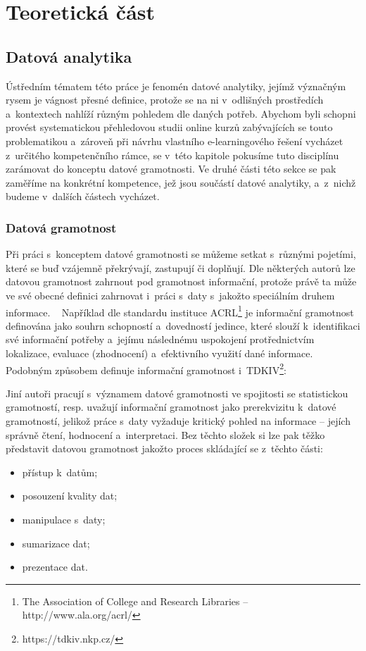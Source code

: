 \part{Teoretická část}

\hypertarget{datovuxe1-analytika}{%
\chapter{Datová analytika}\label{datovuxe1-analytika}}

Ústředním tématem této práce je fenomén datové analytiky, jejímž
význačným rysem je vágnost přesné definice, protože se na ni v~odlišných
prostředích a~kontextech nahlíží různým pohledem dle daných potřeb.
Abychom byli schopni provést systematickou přehledovou studii online
kurzů zabývajících se touto problematikou a~zároveň při návrhu vlastního
e-learningového řešení vycházet z~určitého kompetenčního rámce, se
v~této kapitole pokusíme tuto disciplínu zarámovat do konceptu datové
gramotnosti. Ve druhé části této sekce se pak zaměříme na konkrétní
kompetence, jež jsou součástí datové analytiky, a~z~nichž budeme
v~dalších částech vycházet.

\hypertarget{datovuxe1-gramotnost}{%
\section{Datová gramotnost}\label{datovuxe1-gramotnost}}

Při práci s~konceptem datové gramotnosti se můžeme setkat s~různými
pojetími, které se buď vzájemně překrývají, zastupují či doplňují. Dle
některých autorů lze datovou gramotnost zahrnout pod gramotnost
informační, protože právě ta může ve své obecné definici zahrnovat
i~práci s~daty s~jakožto speciálním druhem informace.
~\parencite[126]{calzada13} Například dle standardu instituce
ACRL\footnote{The Association of College and Research Libraries – http://www.ala.org/acrl/}
je informační gramotnost definována jako souhrn schopností a~dovedností
jedince, které slouží k~identifikaci své informační potřeby a~jejímu
následnému uspokojení protřednictvím lokalizace, evaluace (zhodnocení)
a~efektivního využití dané informace. ~\parencite[2]{acrl06} Podobným
způsobem definuje informační gramotnost
i~TDKIV\footnote{https://tdkiv.nkp.cz/}:
~\parencite{tdkiv03}

Jiní autoři pracují s~významem datové gramotnosti ve spojitosti se
statistickou gramotností, resp. uvažují informační gramotnost jako
prerekvizitu k~datové gramotností, jelikož práce s~daty vyžaduje
kritický pohled na informace -- jejích správně čtení, hodnocení
a~interpretaci. Bez těchto složek si lze pak těžko představit datovou
gramotnost jakožto proces skládající se z~těchto části:
~\parencite[8]{schield05}

\begin{itemize}
\tightlist
\item
  přístup k~datům;
\item
  posouzení kvality dat;
\item
  manipulace s~daty;
\item
  sumarizace dat;
\item
  prezentace dat.
\end{itemize}
